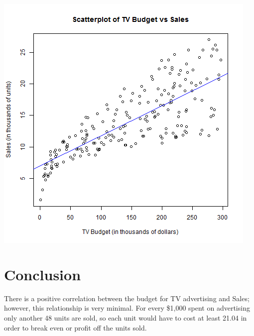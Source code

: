 \documentclass{report}
\begin{document}
\includegraphics{scatterplot-tv-sales.png}


\section*{Conclusion}
There is a positive correlation between the budget for TV advertising and Sales; however, this relationship is very minimal. For every \$1,000 spent on advertising only another 48 units are sold, so each unit would have to
cost at least 21.04 in order to break even or profit off the units sold. 
\end{document}
